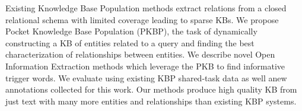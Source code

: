 Existing Knowledge Base Population methods extract relations from a closed relational schema with limited coverage leading to sparse KBs. We propose Pocket Knowledge Base Population (PKBP), the task of dynamically constructing a KB of entities related to a query and finding the best characterization of relationships between entities. We describe novel Open Information Extraction methods which leverage the PKB to find informative trigger words. We evaluate using existing KBP shared-task data as well anew annotations collected for this work. Our methods produce high quality KB from just text with many more entities and relationships than existing KBP systems.
